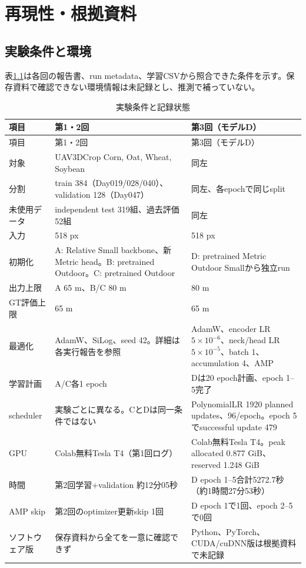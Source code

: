 \chapter{再現性・根拠資料}
\section{実験条件と環境}
表\ref{tab:repro}は各回の報告書、run metadata、学習CSVから照合できた条件を示す。保存資料で確認できない環境情報は未記録とし、推測で補っていない。
\setlength{\tabcolsep}{3pt}
\begin{longtable}{p{}p{}p{}}
\caption{実験条件と記録状態}\label{tab:repro}\\
\toprule 項目&第1・2回&第3回（モデルD）\\\midrule\endfirsthead
\toprule 項目&第1・2回&第3回（モデルD）\\\midrule\endhead
対象&UAV3DCrop Corn, Oat, Wheat, Soybean&同左\\
分割&train 384（Day019/028/040）、validation 128（Day047）&同左、各epochで同じsplit\\
未使用データ&independent test 319組、過去評価52組&同左\\
入力&518 px&518 px\\
初期化&A: Relative Small backbone、新Metric head。B: pretrained Outdoor。C: pretrained Outdoor&D: pretrained Metric Outdoor Smallから独立run\\
出力上限&A 65 m、B/C 80 m&80 m\\
GT評価上限&65 m&65 m\\
最適化&AdamW、SiLog、seed 42。詳細は各実行報告を参照&AdamW、encoder LR $5\times10^{-6}$、neck/head LR $5\times10^{-5}$、batch 1、accumulation 4、AMP\\
学習計画&A/C各1 epoch&Dは20 epoch計画、epoch 1--5完了\\
scheduler&実験ごとに異なる。CとDは同一条件ではない&PolynomialLR 1920 planned updates、96/epoch。epoch 5でsuccessful update 479\\
GPU&Colab無料Tesla T4（第1回ログ）&Colab無料Tesla T4。peak allocated 0.877 GiB、reserved 1.248 GiB\\
時間&第2回学習+validation 約12分05秒&D epoch 1--5合計5272.7秒（約1時間27分53秒）\\
AMP skip&第2回のoptimizer更新skip 1回&D epoch 1で1回、epoch 2--5で0回\\
ソフトウェア版&保存資料から全てを一意に確認できず&Python、PyTorch、CUDA/cuDNN版は根拠資料で未記録\\
\bottomrule
\end{longtable}
\setlength{\tabcolsep}{6pt}

